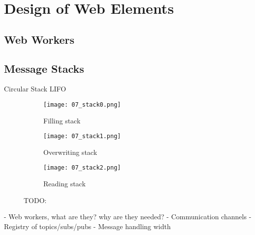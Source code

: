 \chapter{Design of Web Elements}\label{cha:web}

\section{Web Workers}

    

\section{Message Stacks}

    Circular Stack \ac{LIFO}

    \begin{figure}[htbp]
        \centering
        \begin{subfigure}[t]{0.32\textwidth}
            \texttt{[image: 07\_stack0.png]}
            \caption{Filling stack}
        \end{subfigure}
        \begin{subfigure}[t]{0.32\textwidth}
            \texttt{[image: 07\_stack1.png]}
            \caption{Overwriting stack}
        \end{subfigure}
        \begin{subfigure}[t]{0.32\textwidth}
            \texttt{[image: 07\_stack2.png]}
            \caption{Reading stack}
        \end{subfigure}
        \caption{TODO:}\label{fig:circleStack}
    \end{figure}

- Web workers, what are they? why are they needed?
- Communication channels
- Registry of topics/subs/pubs
- Message handling
width